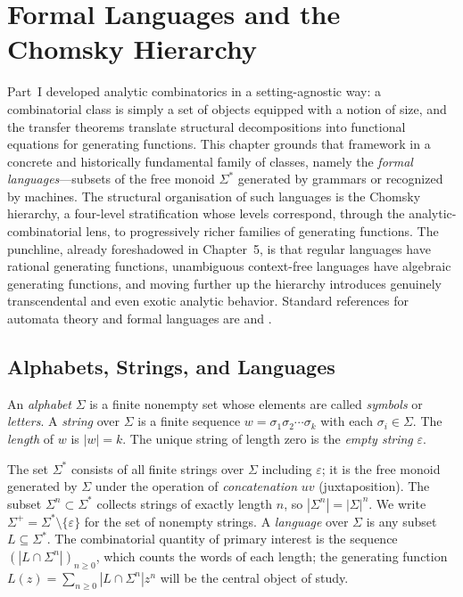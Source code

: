 \chapter{Formal Languages and the Chomsky Hierarchy}

Part~I developed analytic combinatorics in a setting-agnostic way: a combinatorial class is simply a set of objects equipped with a notion of size, and the transfer theorems translate structural decompositions into functional equations for generating functions. This chapter grounds that framework in a concrete and historically fundamental family of classes, namely the \emph{formal languages}—subsets of the free monoid $\Sigma^*$ generated by grammars or recognized by machines. The structural organisation of such languages is the Chomsky hierarchy, a four-level stratification whose levels correspond, through the analytic-combinatorial lens, to progressively richer families of generating functions. The punchline, already foreshadowed in Chapter~5, is that regular languages have rational generating functions, unambiguous context-free languages have algebraic generating functions, and moving further up the hierarchy introduces genuinely transcendental and even exotic analytic behavior. Standard references for automata theory and formal languages are \cite{HopcroftUllman1979} and \cite{Sipser2013}.

\section{Alphabets, Strings, and Languages}

\begin{definition}
An \emph{alphabet} $\Sigma$ is a finite nonempty set whose elements are called \emph{symbols} or \emph{letters}. A \emph{string} over $\Sigma$ is a finite sequence $w = \sigma_1\sigma_2\cdots\sigma_k$ with each $\sigma_i \in \Sigma$. The \emph{length} of $w$ is $|w| = k$. The unique string of length zero is the \emph{empty string} $\varepsilon$.
\end{definition}

The set $\Sigma^*$ consists of all finite strings over $\Sigma$ including $\varepsilon$; it is the free monoid generated by $\Sigma$ under the operation of \emph{concatenation} $uv$ (juxtaposition). The subset $\Sigma^n \subset \Sigma^*$ collects strings of exactly length $n$, so $|\Sigma^n| = |\Sigma|^n$. We write $\Sigma^+ = \Sigma^* \setminus \{\varepsilon\}$ for the set of nonempty strings. A \emph{language} over $\Sigma$ is any subset $L \subseteq \Sigma^*$. The combinatorial quantity of primary interest is the sequence $(|L \cap \Sigma^n|)_{n \ge 0}$, which counts the words of each length; the generating function $L(z) = \sum_{n \ge 0} |L \cap \Sigma^n| z^n$ will be the central object of study.

